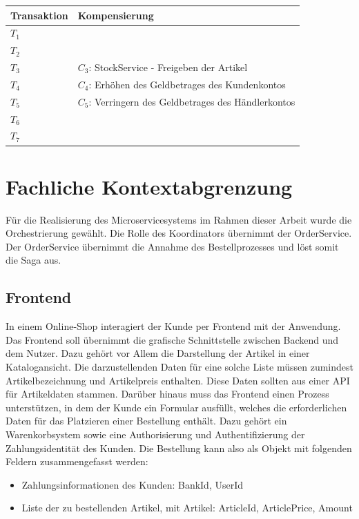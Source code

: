 \begin{center}
	\begin{tabular}[h]{|p{3cm}|p{9.5cm}|}
		\hline
		Transaktion & Kompensierung \\ \hline
		$T_1$ & \\ \hline
		$T_2$ & \\ \hline
		$T_3$ & $C_3$: StockService - Freigeben der Artikel \\ \hline
		$T_4$ & $C_4$: Erhöhen des Geldbetrages des Kundenkontos \\ \hline
		$T_5$ & $C_5$: Verringern des Geldbetrages des Händlerkontos \\ \hline
		$T_6$ & \\ \hline
		$T_7$ & \\ \hline
	\end{tabular}
\end{center}

\section{Fachliche Kontextabgrenzung}

Für die Realisierung des Microservicesystems im Rahmen dieser Arbeit wurde die Orchestrierung gewählt. %
Die Rolle des Koordinators übernimmt der OrderService. Der OrderService übernimmt die Annahme des Bestellprozesses und löst somit die Saga aus. 

\subsection{Frontend}
In einem Online-Shop interagiert der Kunde per Frontend mit der Anwendung. Das Frontend soll übernimmt die grafische Schnittstelle zwischen Backend und dem Nutzer. Dazu gehört vor Allem die Darstellung der Artikel in einer Katalogansicht. Die darzustellenden Daten für eine solche Liste müssen zumindest Artikelbezeichnung und Artikelpreis enthalten. Diese Daten sollten aus einer API für Artikeldaten stammen. Darüber hinaus muss das Frontend einen Prozess unterstützen, in dem der Kunde ein Formular ausfüllt, welches die erforderlichen Daten für das Platzieren einer Bestellung enthält. Dazu gehört ein Warenkorbsystem sowie eine Authorisierung und Authentifizierung der Zahlungsidentität des Kunden. Die Bestellung kann also als Objekt mit folgenden Feldern zusammengefasst werden:
\begin{itemize}
	\item Zahlungsinformationen des Kunden: BankId, UserId
	\item Liste der zu bestellenden Artikel, mit Artikel: ArticleId, ArticlePrice, Amount
\end{itemize}

